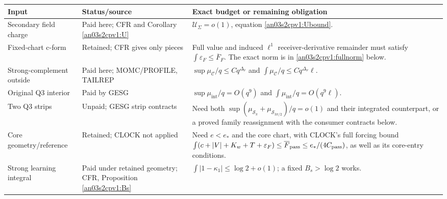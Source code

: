 \documentclass[11pt]{article}
\theoremstyle{remark}\newtheorem{remark}[theorem]{Remark}
\newcommand{\eps}{\varepsilon}
\begin{document}
\begin{longtable}{>{\raggedright\arraybackslash}p{}
 >{\raggedright\arraybackslash}p{}
 >{\raggedright\arraybackslash}p{}}
\textbf{Input}&\textbf{Status/source}&\textbf{Exact budget or remaining obligation}\\\hline
Secondary field charge&Paid here; CFR and Corollary \ref{an03s2cpv1:U}&
$\mathcal U_\Sigma=o(1)$, equation \eqref{an03s2cpv1:Ubound}.\\[4pt]
Fixed-chart c-form&Retained; CFR gives only pieces&
Full value and induced $\ell^1$ receiver-derivative remainder must satisfy
$\int\eps_F\le\overline F_F$. The exact norm is in
\eqref{an03s2cpv1:fullnorm} below.\\[4pt]
Strong-complement outside&Paid here; MOMC/PROFILE, TAILREP&
$\sup\mu_{\mathcal C}/q\le Cq^{\Delta_\nu}$ and
$\int\mu_{\mathcal C}/q\le Cq^{\Delta_\nu}\ell$.\\[4pt]
Original Q3 interior&Paid by GESG&
$\sup\mu_{\mathrm{int}}/q=O(q^9)$ and
$\int\mu_{\mathrm{int}}/q=O(q^9\ell)$.\\[4pt]
Two Q3 strips&Unpaid; GESG strip contracts&
Need both $\sup(\mu_{\mathcal S_\pi}+\mu_{\mathcal S_{3\pi/2}})/q=o(1)$
and their integrated counterpart, or a proved family reassignment
with the consumer contracts below.\\[4pt]
Core geometry/reference&Retained; CLOCK not applied&
Need $e<e_*$ and the core chart, with CLOCK's full forcing bound
$\int(c+|V|+K_w+T+\eps_F)\le\overline F_{\rm pass}
\le e_*/(4C_{\rm pass})$, as well as its core-entry conditions.\\[4pt]
Strong learning integral&Paid under retained geometry; CFR, Proposition \ref{an03s2cpv1:Bs}&
$\int|1-\kappa_1|\le\log2+o(1)$; a fixed $B_s>\log2$ works.\\
\end{longtable}
\end{document}
